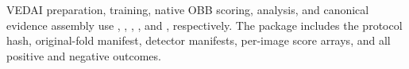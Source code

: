 \documentclass[11pt]{article}
\begin{document}
VEDAI preparation, training, native OBB scoring, analysis, and canonical
evidence assembly use ,
,
,
, and
, respectively. The package
includes the protocol hash, original-fold manifest, detector manifests,
per-image score arrays, and all positive and negative outcomes.
\end{document}
